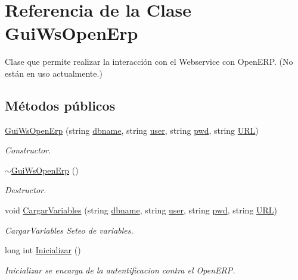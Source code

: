 \hypertarget{classGuiWsOpenErp}{}\section{Referencia de la Clase Gui\+Ws\+Open\+Erp}
\label{classGuiWsOpenErp}


Clase que permite realizar la interacción con el Webservice con Open\+E\+RP. (No están en uso actualmente.)  


\subsection*{Métodos públicos}
\begin{DoxyCompactItemize}
\item 
\hyperlink{classGuiWsOpenErp_a468b3c76510469edce574ee3c2a86056}{Gui\+Ws\+Open\+Erp} (string \hyperlink{classGuiWsOpenErp_aa872d8ffb6c11032ec0dcfd8ee49e234}{dbname}, string \hyperlink{classGuiWsOpenErp_a34037b0900d58859cc4c42e77f170d82}{user}, string \hyperlink{classGuiWsOpenErp_ad82141631eb4a41cd62b1c8892424a92}{pwd}, string \hyperlink{classGuiWsOpenErp_a96c46b5aed53de6d0fca055f28862be5}{U\+RL})
\begin{DoxyCompactList}\small\item\em Constructor. \end{DoxyCompactList}\item 
\hyperlink{classGuiWsOpenErp_ac01e603d5d8486d9fef6f55b679cc8b6}{$\sim$\+Gui\+Ws\+Open\+Erp} ()
\begin{DoxyCompactList}\small\item\em Destructor. \end{DoxyCompactList}\item 
void \hyperlink{classGuiWsOpenErp_a72e93c46fcdf1317d7a554181f6e08e1}{Cargar\+Variables} (string \hyperlink{classGuiWsOpenErp_aa872d8ffb6c11032ec0dcfd8ee49e234}{dbname}, string \hyperlink{classGuiWsOpenErp_a34037b0900d58859cc4c42e77f170d82}{user}, string \hyperlink{classGuiWsOpenErp_ad82141631eb4a41cd62b1c8892424a92}{pwd}, string \hyperlink{classGuiWsOpenErp_a96c46b5aed53de6d0fca055f28862be5}{U\+RL})
\begin{DoxyCompactList}\small\item\em Cargar\+Variables Seteo de variables. \end{DoxyCompactList}\item 
long int \hyperlink{classGuiWsOpenErp_a48d629317e4b3be8b5471e5a14a60082}{Inicializar} ()
\begin{DoxyCompactList}\small\item\em Inicializar se encarga de la autentificacion contra el Open\+E\+RP. \end{DoxyCompactList}\item 

\end{DoxyCompactItemize}
